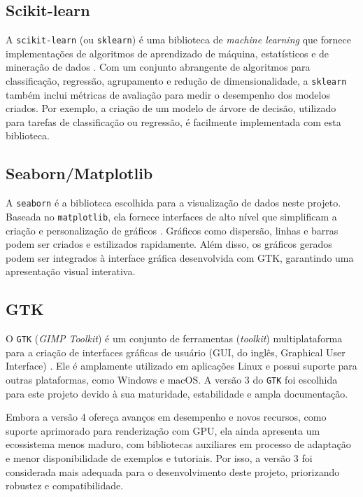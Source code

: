 \subsection{Scikit-learn}

A \texttt{scikit-learn} (ou \texttt{sklearn}) é uma biblioteca de \textit{machine learning} que fornece implementações de algoritmos de aprendizado de máquina, estatísticos e de mineração de dados \citep{scikit-learn2022}. Com um conjunto abrangente de algoritmos para classificação, regressão, agrupamento e redução de dimensionalidade, a \texttt{sklearn} também inclui métricas de avaliação para medir o desempenho dos modelos criados. Por exemplo, a criação de um modelo de árvore de decisão, utilizado para tarefas de classificação ou regressão, é facilmente implementada com esta biblioteca.

\subsection{Seaborn/Matplotlib}

A \texttt{seaborn} é a biblioteca escolhida para a visualização de dados neste projeto. Baseada no \texttt{matplotlib}, ela fornece interfaces de alto nível que simplificam a criação e personalização de gráficos \citep{seaborn}. Gráficos como dispersão, linhas e barras podem ser criados e estilizados rapidamente. Além disso, os gráficos gerados podem ser integrados à interface gráfica desenvolvida com GTK, garantindo uma apresentação visual interativa.

\subsection{GTK}

O \texttt{GTK} (\textit{GIMP Toolkit}) é um conjunto de ferramentas (\textit{toolkit}) multiplataforma para a criação de interfaces gráficas de usuário (GUI, do inglês, Graphical User Interface) \citep{gtk}. Ele é amplamente utilizado em aplicações Linux e possui suporte para outras plataformas, como Windows e macOS. A versão 3 do \texttt{GTK} foi escolhida para este projeto devido à sua maturidade, estabilidade e ampla documentação.

Embora a versão 4 ofereça avanços em desempenho e novos recursos, como suporte aprimorado para renderização com GPU, ela ainda apresenta um ecossistema menos maduro, com bibliotecas auxiliares em processo de adaptação e menor disponibilidade de exemplos e tutoriais. Por isso, a versão 3 foi considerada mais adequada para o desenvolvimento deste projeto, priorizando robustez e compatibilidade.

